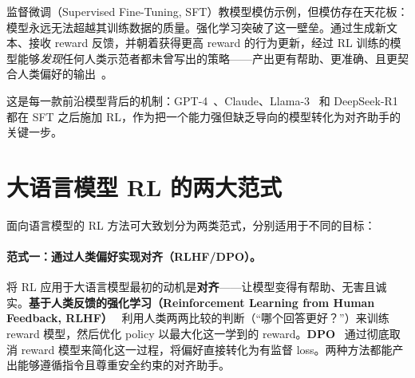 监督微调（Supervised Fine-Tuning, SFT）教模型模仿示例，但模仿存在天花板：模型永远无法超越其训练数据的质量。强化学习突破了这一壁垒。通过生成新文本、接收 reward 反馈，并朝着获得更高 reward 的行为更新，经过 RL 训练的模型能够\emph{发现}任何人类示范者都未曾写出的策略——产出更有帮助、更准确、且更契合人类偏好的输出~\cite{ouyang2022training}。

这是每一款前沿模型背后的机制：GPT-4~\cite{openai2023gpt4}、Claude、Llama-3~\cite{grattafiori2024llama3} 和 DeepSeek-R1~\cite{deepseek2025r1} 都在 SFT 之后施加 RL，作为把一个能力强但缺乏导向的模型转化为对齐助手的关键一步。

\section{大语言模型 RL 的两大范式}
\label{two-paradigms-rl-llms}

面向语言模型的 RL 方法可大致划分为两类范式，分别适用于不同的目标：

\paragraph{范式一：通过人类偏好实现对齐（RLHF/DPO）。}
将 RL 应用于大语言模型最初的动机是\textbf{对齐}——让模型变得有帮助、无害且诚实。\textbf{基于人类反馈的强化学习（Reinforcement Learning from Human Feedback, RLHF）}~\cite{ouyang2022training, ziegler2019fine, christiano2017deep} 利用人类两两比较的判断（“哪个回答更好？”）来训练 reward 模型，然后优化 policy 以最大化这一学到的 reward。\textbf{DPO}~\cite{rafailov2023direct} 通过彻底取消 reward 模型来简化这一过程，将偏好直接转化为有监督 loss。两种方法都能产出能够遵循指令且尊重安全约束的对齐助手。

